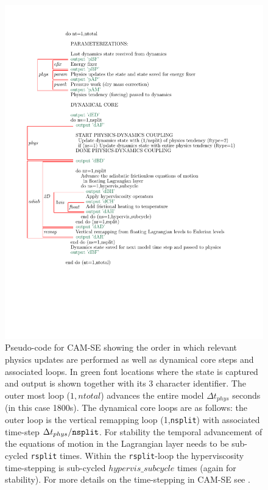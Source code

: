 \documentclass[draft,linenumbers]{agujournal}
\begin{document}
\begin{figure}[h]
\centering
 \includegraphics[width=35pc]{new_pseudo-code.pdf}
\caption{Pseudo-code for CAM-SE showing the order in which relevant physics updates are performed as well as dynamical core steps and associated loops. In green font locations where the state is captured and output is shown together with its 3 character identifier. The outer most loop ($1,ntotal$)  advances the entire model $\Delta t_{phys}$ seconds (in this case 1800s). The dynamical core loops are as follows: the outer loop is the vertical remapping loop (1,{\tt{nsplit}}) with associated time-step $\Delta t_{phys}/{\tt{nsplit}}$. For stability the temporal advancement of the equations of motion in the Lagrangian layer needs to be sub-cycled {\tt{rsplit}} times. Within the {\tt{rsplit}}-loop the hyperviscosity time-stepping is sub-cycled $hypervis\_subcycle$ times (again for stability). For more details on the time-stepping in CAM-SE see \citet{LetAl2018JAMES}.}
\label{fig:dAD}
\end{figure}
\end{document}
